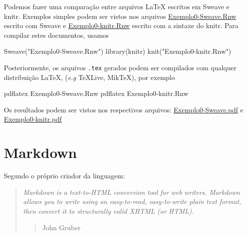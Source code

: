 \documentclass[
  10pt,
  a4paper]{book}
\newenvironment{Shaded}{\begin{snugshade}}{\end{snugshade}}
\newcommand{\ExtensionTok}[1]{#1}
\newcommand{\FunctionTok}[1]{\textcolor[rgb]{0.00,0.00,0.00}{#1}}
\newcommand{\NormalTok}[1]{#1}
\newcommand{\StringTok}[1]{\textcolor[rgb]{0.31,0.60,0.02}{#1}}
\begin{document}
Podemos fazer uma comparação entre arquivos LaTeX escritos em Sweave
e knitr. Exemplos simples podem ser vistos nos arquivos
\href{exemplos/Exemplo0-Sweave.Rnw}{Exemplo0-Sweave.Rnw} escrito com Sweave e
\href{exemplos/Exemplo0-knitr.Rnw}{Exemplo0-knitr.Rnw} escrito com a sintaxe
do knitr. Para compilar estes documentos, usamos

\begin{Shaded}
\begin{Highlighting}[]
\FunctionTok{Sweave}\NormalTok{(}\StringTok{"Exemplo0{-}Sweave.Rnw"}\NormalTok{)}
\FunctionTok{library}\NormalTok{(knitr)}
\FunctionTok{knit}\NormalTok{(}\StringTok{"Exemplo0{-}knitr.Rnw"}\NormalTok{)}
\end{Highlighting}
\end{Shaded}

Posteriormente, os arquivos \texttt{.tex} gerados podem ser compilados com
qualquer distribuição LaTeX, (\emph{e.g} TeXLive, MikTeX), por exemplo

\begin{Shaded}
\begin{Highlighting}[]
\ExtensionTok{pdflatex}\NormalTok{ Exemplo0{-}Sweave.Rnw}
\ExtensionTok{pdflatex}\NormalTok{ Exemplo0{-}knitr.Rnw}
\end{Highlighting}
\end{Shaded}

Os resultados podem ser vistos nos respectivos arquivos:
\href{exemplos/Exemplo0-Sweave.pdf}{Exemplo0-Sweave.pdf} e
\href{exemplos/Exemplo0-knitr.pdf}{Exemplo0-knitr.pdf}

\hypertarget{markdown}{%
\section{Markdown}\label{markdown}}

Segundo o próprio criador da linguagem:

\begin{quote}
\emph{Markdown is a text-to-HTML conversion tool for web writers. Markdown
allows you to write using an easy-to-read, easy-to-write plain text
format, then convert it to structurally valid XHTML (or HTML).}

\begin{quote}
John Gruber
\end{quote}
\end{quote}
\end{document}
